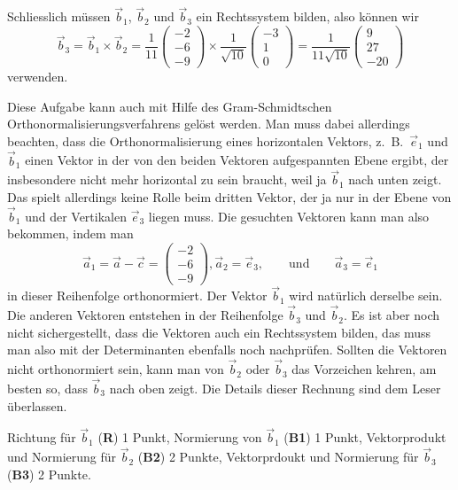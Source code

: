 \begin{loesung}
\[\]
Schliesslich müssen $\vec{b}_1$, $\vec{b}_2$ und $\vec{b}_3$ ein
Rechtssystem bilden, also können wir
\[
\vec{b}_3
=
\vec{b}_1\times\vec{b}_2
=
\frac1{11}
\begin{pmatrix} -2\\-6\\-9\end{pmatrix}
\times
\frac{1}{\sqrt{10}}
\begin{pmatrix} -3\\1\\ 0 \end{pmatrix}
=
\frac{1}{11\sqrt{10}}
\begin{pmatrix}
9\\
27\\
-20
\end{pmatrix}
\]
verwenden.

Diese Aufgabe kann auch mit Hilfe des Gram-Schmidtschen
Orthonormalisierungsverfahrens gelöst werden.
Man muss dabei allerdings beachten, dass die Orthonormalisierung eines
horizontalen Vektors, z.~B.~$\vec{e}_1$ und $\vec{b}_1$ einen Vektor 
in der von den beiden Vektoren aufgespannten Ebene ergibt, der insbesondere
nicht mehr horizontal zu sein braucht, weil ja $\vec{b}_1$ nach unten zeigt.
Das spielt allerdings keine Rolle beim dritten Vektor, der ja nur in der
Ebene von $\vec{b}_1$ und der Vertikalen $\vec{e}_3$ liegen muss.
Die gesuchten Vektoren kann man also bekommen, indem man
\[
\vec{a}_1
=
\vec{a}-\vec{c}
=
\begin{pmatrix} -2\\-6\\-9\end{pmatrix},
\vec{a}_2 = \vec{e}_3,
\qquad\text{und}\qquad
\vec{a}_3 = \vec{e}_1
\]
in dieser Reihenfolge orthonormiert.
Der Vektor $\vec{b}_1$ wird natürlich derselbe sein.
Die anderen Vektoren entstehen in der Reihenfolge $\vec{b}_3$ und $\vec{b}_2$.
Es ist aber noch nicht sichergestellt, dass die Vektoren auch ein Rechtssystem
bilden, das muss man also mit der Determinanten ebenfalls noch nachprüfen.
Sollten die Vektoren nicht orthonormiert sein, kann man von $\vec{b}_2$
oder $\vec{b}_3$ das Vorzeichen kehren, am besten so, dass $\vec{b}_3$ nach
oben zeigt.
Die Details dieser Rechnung sind dem Leser überlassen.
\end{loesung}

\begin{bewertung}
Richtung für $\vec{b}_1$ ({\bf R}) 1 Punkt,
Normierung von $\vec{b}_1$ ({\bf B1}) 1 Punkt,
Vektorprodukt und Normierung für $\vec{b}_2$ ({\bf B2}) 2 Punkte,
Vektorprdoukt und Normierung für $\vec{b}_3$ ({\bf B3}) 2 Punkte.
\end{bewertung}
